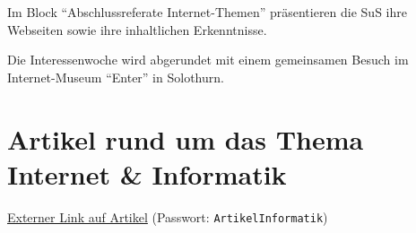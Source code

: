 Im Block \enquote{Abschlussreferate Internet-Themen} präsentieren die SuS ihre Webseiten sowie ihre inhaltlichen Erkenntnisse.

Die Interessenwoche wird abgerundet mit einem gemeinsamen Besuch im Internet-Museum \enquote{Enter} in Solothurn.

\section{Artikel rund um das Thema Internet \& Informatik}

\href{https://cvb.synology.me:5001/d/s/xflXoKAdPcwsUA7UOIPYdo5mTBH1Fbed/-WXHCLktNMkJ3LkzV_FPl3swz1tTFKgx-4LFAJedcbws}{\faLink{} Externer Link auf Artikel} (Passwort: \texttt{ArtikelInformatik})
